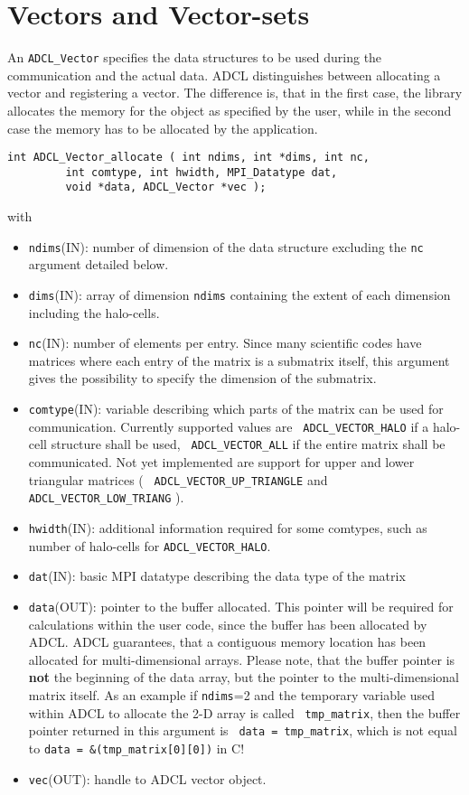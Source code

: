 \section{Vectors and Vector-sets}

An {\tt ADCL\_Vector} specifies the data structures to be used during the
communication and the actual data. ADCL distinguishes between allocating a
vector and registering a vector. The difference is, that in the first case,
the library allocates the memory for the object as specified by the user,
while in the second case the memory has to be allocated by the application.

\begin{verbatim}
int ADCL_Vector_allocate ( int ndims, int *dims, int nc, 
         int comtype, int hwidth, MPI_Datatype dat, 
         void *data, ADCL_Vector *vec );
\end{verbatim}
with
\begin{itemize}
\item {\tt ndims}(IN): number of dimension of the data structure excluding the
  {\tt nc} argument detailed below.
\item {\tt dims}(IN): array of dimension {\tt ndims} containing the extent of
  each dimension including the halo-cells.
\item {\tt nc}(IN): number of elements per entry. Since many scientific codes
  have matrices where each entry of the matrix is a submatrix itself, this
  argument gives the possibility to specify the dimension of the submatrix.
\item {\tt comtype}(IN): variable describing which parts of the matrix can be
  used for communication. Currently supported values are {\tt
    ADCL\_VECTOR\_HALO} if a halo-cell structure shall be used, {\tt
    ADCL\_VECTOR\_ALL} if the entire matrix shall be communicated. Not yet
  implemented are support for upper and lower triangular matrices ( {\tt
    ADCL\_VECTOR\_UP\_TRIANGLE} and {\tt ADCL\_VECTOR\_LOW\_TRIANG} ).
\item {\tt hwidth}(IN): additional information required for some comtypes,
  such as number of halo-cells for {\tt ADCL\_VECTOR\_HALO}.
\item {\tt dat}(IN): basic MPI datatype describing the data type of the matrix
\item {\tt data}(OUT): pointer to the buffer allocated. This pointer will be
  required for calculations within the user code, since the buffer has been
  allocated by ADCL. ADCL guarantees, that a contiguous memory location has
  been allocated for multi-dimensional arrays. Please note, that the buffer
  pointer is {\bf not} the beginning of the data array, but the pointer to the
  multi-dimensional matrix itself. As an example if {\tt ndims}=2 and the
  temporary variable used within ADCL to allocate the 2-D array is called {\tt
    tmp\_matrix}, then the buffer pointer returned in this argument is {\tt
    data = tmp\_matrix}, which is not equal to {\tt data =
    \&(tmp\_matrix[0][0])} in C!
\item {\tt vec}(OUT): handle to ADCL vector object.
\end{itemize}
